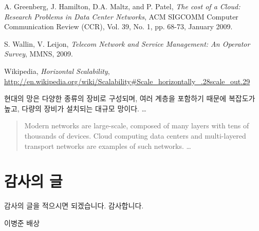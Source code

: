 \documentclass[doctor,korean,final]{cnu-ecs}
\begin{document}

%
%
%
\begin{thebibliography}{1}

A. Greenberg, J. Hamilton, D.A. Maltz, and P. Patel,
\emph{The cost of a Cloud: Research Problems in Data Center Networks},
ACM SIGCOMM Computer Communication Review (CCR), 
Vol. 39, No. 1, pp. 68-73, January 2009.

S. Wallin, V. Leijon, 
\emph{Telecom Network and Service Management: An Operator Survey}, 
MMNS, 2009.

Wikipedia, \emph{Horizontal Scalability},
\url{http://en.wikipedia.org/wiki/Scalability#Scale_horizontally_.28scale_out.29}

\end{thebibliography}

\begin{summary}
현대의 망은 다양한 종류의 장비로 구성되며, 여러 계층을 포함하기 때문에 복잡도가 높고,
다량의 장비가 설치되는 대규모 망이다. 
\ldots
\end{summary}

\begin{abstract}
Modern networks are large-scale, composed of many layers with tens of thousands of devices. 
Cloud computing data centers and multi-layered transport networks are 
examples of such networks.
\ldots
\end{abstract}

\chapter*{감사의 글}

감사의 글을 적으시면 되겠습니다.
감사합니다.

\begin{flushright}
\vspace{1cm}
이병준 배상
\end{flushright}
\end{document}
